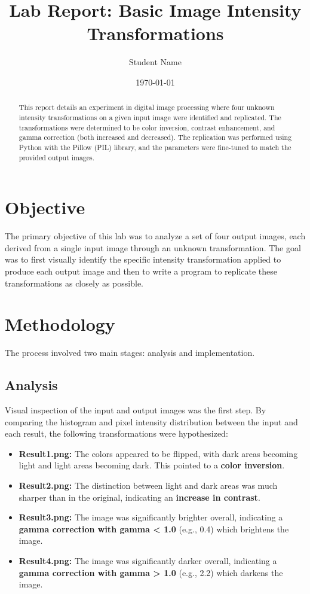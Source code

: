 \documentclass{article}
\title{Lab Report: Basic Image Intensity Transformations}
\author{Student Name}
\date{\today}
\begin{document}
\maketitle

\begin{abstract}
This report details an experiment in digital image processing where four unknown intensity transformations on a given input image were identified and replicated. The transformations were determined to be color inversion, contrast enhancement, and gamma correction (both increased and decreased). The replication was performed using Python with the Pillow (PIL) library, and the parameters were fine-tuned to match the provided output images.
\end{abstract}

\section{Objective}
The primary objective of this lab was to analyze a set of four output images, each derived from a single input image through an unknown transformation. The goal was to first visually identify the specific intensity transformation applied to produce each output image and then to write a program to replicate these transformations as closely as possible.

\section{Methodology}
The process involved two main stages: analysis and implementation.

\subsection{Analysis}
Visual inspection of the input and output images was the first step. By comparing the histogram and pixel intensity distribution between the input and each result, the following transformations were hypothesized:
\begin{itemize}
    \item \textbf{Result1.png:} The colors appeared to be flipped, with dark areas becoming light and light areas becoming dark. This pointed to a \textbf{color inversion}.
    \item \textbf{Result2.png:} The distinction between light and dark areas was much sharper than in the original, indicating an \textbf{increase in contrast}.
    \item \textbf{Result3.png:} The image was significantly brighter overall, indicating a \textbf{gamma correction with gamma < 1.0} (e.g., 0.4) which brightens the image.
    \item \textbf{Result4.png:} The image was significantly darker overall, indicating a \textbf{gamma correction with gamma > 1.0} (e.g., 2.2) which darkens the image.
\end{itemize}
\end{document}
